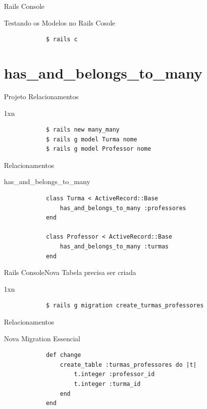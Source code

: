 \documentclass{beamer}
\begin{document}
\begin{frame}[fragile]{Rails Console}
	\begin{block} {\LARGE Testando os Modelos no Rails Cosole}
		\begin{verbatim}
			$ rails c
		\end{verbatim}
	\end{block}
\end{frame}

\section{has\_and\_belongs\_to\_many}

\begin{frame}[fragile]{Projeto Relacionamentos}
	\begin{block} {1xn}
		\begin{verbatim}
		  	$ rails new many_many
		  	$ rails g model Turma nome 
		  	$ rails g model Professor nome
		\end{verbatim}
	\end{block}
\end{frame}

\begin{frame}[fragile]{Relacionamentos}
	\begin{block} {\LARGE has\_and\_belongs\_to\_many}
		\begin{verbatim}
		  	class Turma < ActiveRecord::Base
		  	    has_and_belongs_to_many :professores
		  	end
		  	
		  	class Professor < ActiveRecord::Base
		  	    has_and_belongs_to_many :turmas
		  	end
		\end{verbatim}
	\end{block}
\end{frame}

\begin{frame}[fragile]{Rails Console}{Nova Tabela precisa ser criada}
	\begin{block} {1xn}
		\begin{verbatim}
		  	$ rails g migration create_turmas_professores
		\end{verbatim}
	\end{block}
\end{frame}

\begin{frame}[fragile]{Relacionamentos}
	\begin{block} {\LARGE Nova Migration Essencial}
		\begin{verbatim}
		    def change
		        create_table :turmas_professores do |t|
		            t.integer :professor_id
		            t.integer :turma_id			
		        end
		    end
		\end{verbatim}
	\end{block}
\end{frame}
\end{document}
